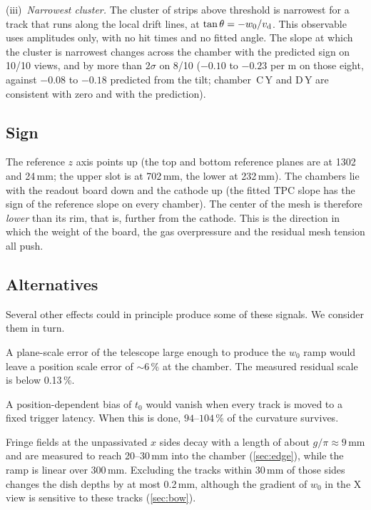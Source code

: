 (iii)~\emph{Narrowest cluster.} The cluster of strips above threshold is narrowest for a track that runs along the
local drift lines, at $\tan\theta = -w_0/v_\mathrm{d}$. This observable uses amplitudes only, with no hit times and no fitted
angle. The slope at which the cluster is narrowest changes across the chamber with the predicted sign on 10/10 views,
and by more than $2\sigma$ on 8/10 ($-0.10$ to $-0.23$ per m on those eight, against $-0.08$ to $-0.18$ predicted from
the tilt; chamber~C\,Y and D\,Y are consistent with zero and with the prediction).

\subsection{Sign}
The reference $z$ axis points up (the top and bottom reference planes are at 1302 and 24\,mm; the upper slot
is at 702\,mm, the lower at 232\,mm). The chambers lie with the readout board down and the cathode up (the fitted
TPC slope has the sign of the reference slope on every chamber). The center of the mesh is therefore \emph{lower} than
its rim, that is, further from the cathode. This is the direction in which the weight of the board, the gas
overpressure and the residual mesh tension all push.

\subsection{Alternatives}
Several other effects could in principle produce some of these signals. We consider them in turn.

A plane-scale error of the telescope large enough to produce the $w_0$ ramp would leave a position scale error of
$\sim$6\,\% at the chamber. The measured residual scale is below 0.13\,\%.

A position-dependent bias of $t_0$ would vanish when every track is moved to a fixed trigger latency. When this is
done, $94$--$104$\,\% of the curvature survives.

Fringe fields at the unpassivated $x$ sides decay with a length of about $g/\pi\approx9$\,mm and are measured to reach
20--30\,mm into the chamber (\cref{sec:edge}), while the ramp is linear over 300\,mm. Excluding the tracks within
30\,mm of those sides changes the dish depths by at most 0.2\,mm, although the gradient of $w_0$ in the X view is
sensitive to these tracks (\cref{sec:bow}).

